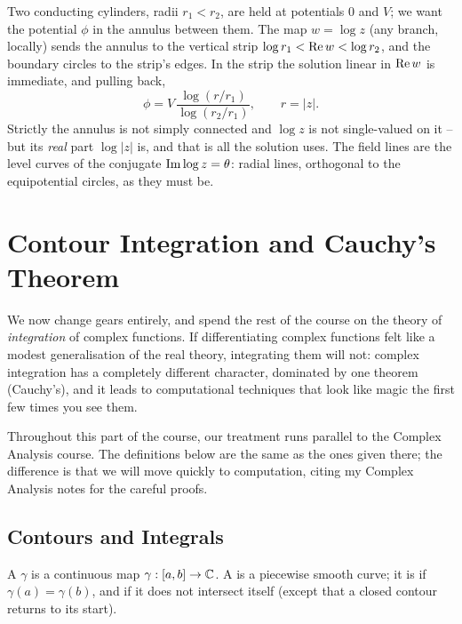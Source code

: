 \documentclass[a4paper]{scrartcl}
\begin{document}
\begin{example}
	Two conducting cylinders, radii $r_1 < r_2$, are held at potentials $0$ and $V$; we want the potential $\phi$ in the annulus between them. The map $w = \log z$ (any branch, locally) sends the annulus to the vertical strip $\log r_1 < \operatorname{Re} w < \log r_2$, and the boundary circles to the strip's edges. In the strip the solution linear in $\operatorname{Re} w$ is immediate, and pulling back,
	$$
	\phi = V \, \frac{\log(r/r_1)}{\log(r_2/r_1)}, \qquad r = |z|.
	$$
	Strictly the annulus is not simply connected and $\log z$ is not single-valued on it -- but its \emph{real} part $\log |z|$ is, and that is all the solution uses. The field lines are the level curves of the conjugate $\operatorname{Im} \log z = \theta$: radial lines, orthogonal to the equipotential circles, as they must be.
\end{example}

\section{Contour Integration and Cauchy's Theorem}

We now change gears entirely, and spend the rest of the course on the theory of \emph{integration} of complex functions. If differentiating complex functions felt like a modest generalisation of the real theory, integrating them will not: complex integration has a completely different character, dominated by one theorem (Cauchy's), and it leads to computational techniques that look like magic the first few times you see them.

Throughout this part of the course, our treatment runs parallel to the Complex Analysis course. The definitions below are the same as the ones given there; the difference is that we will move quickly to computation, citing my Complex Analysis notes for the careful proofs.

\subsection{Contours and Integrals}

\begin{definition}[Contour]
	A  $\gamma$ is a continuous map $\gamma : [a, b] \to \mathbb{C}$. A  is a piecewise smooth curve; it is  if $\gamma(a) = \gamma(b)$, and  if it does not intersect itself (except that a closed contour returns to its start).
\end{definition}
\end{document}
